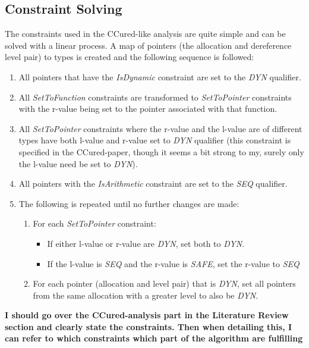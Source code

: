 \subsection{Constraint Solving}

The constraints used in the CCured-like analysis are quite simple and can be solved with a linear process.
A map of pointers (the allocation and dereference level pair) to types is created and the following sequence is followed:

\begin{enumerate}
\item All pointers that have the \textit{IsDynamic} constraint are set to the \textit{DYN} qualifier.
\item All \textit{SetToFunction} constraints are transformed to \textit{SetToPointer} constraints with the r-value being set to the pointer associated with that function.
\item All \textit{SetToPointer} constraints where the r-value and the l-value are of different types have both l-value and r-value set to \textit{DYN} qualifier (this constraint is specified in the CCured-paper, though it seems a bit strong to my, surely only the l-value need be set to \textit{DYN}).
\item All pointers with the \textit{IsArithmetic} constraint are set to the \textit{SEQ} qualifier.
\item The following is repeated until no further changes are made:
    \begin{enumerate}
        \item For each \textit{SetToPointer} constraint:
        \begin{itemize}
            \item If either l-value or r-value are \textit{DYN}, set both to \textit{DYN}.
            \item If the l-value is \textit{SEQ} and the r-value is \textit{SAFE}, set the r-value to \textit{SEQ}
        \end{itemize}
        \item For each pointer (allocation and level pair) that is \textit{DYN}, set all pointers from the same allocation with a greater level to also be \textit{DYN}.
    \end{enumerate}
\end{enumerate}

\textbf{I should go over the CCured-analysis part in the Literature Review section and clearly state the constraints. Then when detailing this, I can refer to which constraints which part of the algorithm are fulfilling}

